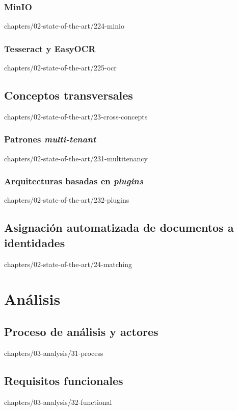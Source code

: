 \documentclass[epsbased,tfg,covers,final,printable,extendedindex,%
               firstnumbered,lof,lot, loc]{tfgtfmthesisuam}
\begin{document}
    \subsection{MinIO\label{SS:SOTA-MINIO}}%
                {chapters/02-state-of-the-art/224-minio}
    \subsection{Tesseract y EasyOCR\label{SS:SOTA-OCR}}%
                {chapters/02-state-of-the-art/225-ocr}
  \section{Conceptos transversales\label{SEC:SOTA-CROSS}}%
          {chapters/02-state-of-the-art/23-cross-concepts}
    \subsection[Patrones multi-tenant]%
                {Patrones \textit{multi-tenant}\label{SS:SOTA-MULTITENANT}}%
                {chapters/02-state-of-the-art/231-multitenancy}
    \subsection[Arquitecturas basadas en plugins]%
                {Arquitecturas basadas en
                 \emph{plugins}\label{SS:SOTA-PLUGINS}}%
                {chapters/02-state-of-the-art/232-plugins}

  \section{Asignación automatizada de documentos a identidades%
           \label{SEC:SOTA-MATCHING}}%
          {chapters/02-state-of-the-art/24-matching}

\chapter{Análisis\label{CAP:ANALYSIS}}
  \section{Proceso de análisis y actores\label{SEC:ANALYSIS-PROCESS}}%
          {chapters/03-analysis/31-process}
  \section{Requisitos funcionales\label{SEC:ANALYSIS-RF}}%
          {chapters/03-analysis/32-functional}
\end{document}
